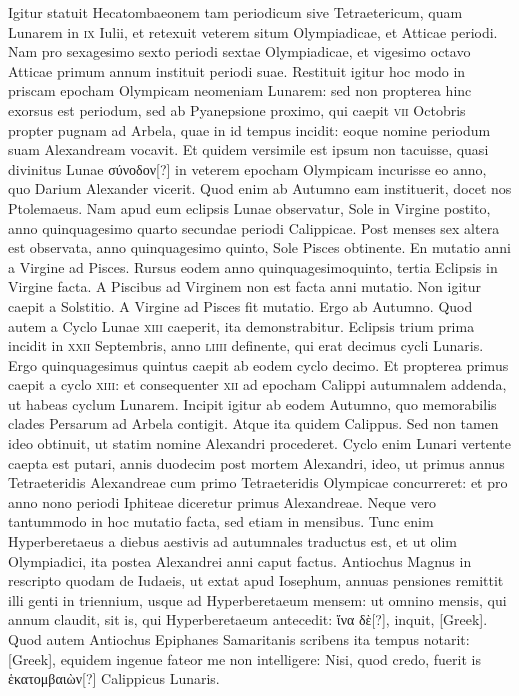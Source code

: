 Igitur statuit Hecatombaeonem tam periodicum
sive Tetraetericum, quam Lunarem in \textsc{ix} Iulii, et retexuit veterem
situm Olympiadicae, et Atticae periodi.
Nam pro sexagesimo sexto periodi
sextae Olympiadicae, et vigesimo octavo Atticae primum annum
instituit periodi suae.
Restituit igitur hoc modo in priscam epocham
Olympicam neomeniam Lunarem: sed non propterea hinc exorsus
est periodum, sed ab Pyanepsione proximo, qui caepit \textsc{vii} Octobris
propter pugnam ad Arbela, quae in id tempus incidit: eoque nomine
periodum suam Alexandream vocavit.
Et quidem versimile est ipsum
non tacuisse, quasi divinitus Lunae \textgreek{σύνοδον[?]}
 in veterem epocham Olympicam
incurisse eo anno, quo Darium Alexander vicerit.
Quod
enim ab Autumno eam instituerit, docet nos Ptolemaeus.
Nam apud
eum eclipsis Lunae observatur, Sole in Virgine postito, anno quinquagesimo
quarto secundae periodi Calippicae.
Post menses sex altera est
observata, anno quinquagesimo quinto, Sole Pisces obtinente.
En
mutatio anni a Virgine ad Pisces.
Rursus eodem anno quinquagesimoquinto,
tertia Eclipsis in Virgine facta.
A Piscibus ad Virginem
non est facta anni mutatio.
Non igitur caepit a Solstitio.
A Virgine
ad Pisces fit mutatio.
Ergo ab Autumno.
Quod autem a Cyclo Lunae
\textsc{xiii} caeperit, ita demonstrabitur.
Eclipsis trium prima incidit in
\textsc{xxii} Septembris, anno \textsc{liiii} definente,
 qui erat decimus cycli Lunaris.
Ergo quinquagesimus quintus caepit ab eodem cyclo decimo.
Et propterea primus caepit a cyclo \textsc{xiii}: et consequenter
 \textsc{xii} ad epocham
Calippi autumnalem addenda, ut habeas cyclum Lunarem.
Incipit igitur ab eodem Autumno, quo memorabilis clades Persarum
ad Arbela contigit.
Atque ita quidem Calippus.
Sed non tamen
ideo obtinuit, ut statim nomine Alexandri procederet.
Cyclo
enim Lunari vertente caepta est putari, annis duodecim post mortem
Alexandri, ideo, ut primus annus Tetraeteridis Alexandreae cum primo
Tetraeteridis Olympicae concurreret: et pro anno nono periodi
Iphiteae diceretur primus Alexandreae.
Neque vero tantummodo in
hoc mutatio facta, sed etiam in mensibus.
Tunc enim Hyperberetaeus
a diebus aestivis ad autumnales traductus est, et ut olim Olympiadici,
ita postea Alexandrei anni caput factus.
Antiochus Magnus in
rescripto quodam de Iudaeis, ut extat apud Iosephum, annuas pensiones
remittit illi genti in triennium, usque ad Hyperberetaeum mensem:
ut omnino mensis, qui annum claudit, sit is, qui Hyperberetaeum
antecedit: \textgreek{ἵνα δὲ[?]}, inquit, \textgreek{[Greek]}.
Quod autem Antiochus Epiphanes Samaritanis scribens ita tempus
notarit: \textgreek{[Greek]}, equidem ingenue fateor me non intelligere:
Nisi, quod credo, fuerit is \textgreek{ἑκατομβαιὼν[?]} Calippicus Lunaris.

